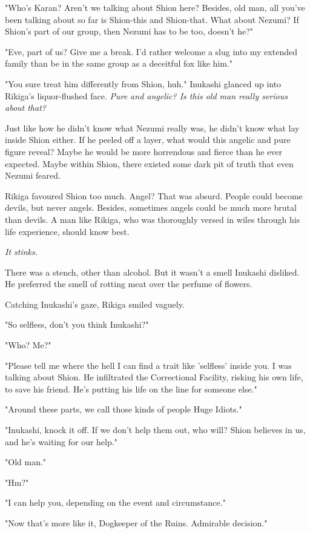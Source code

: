 "Who's Karan? Aren't we talking about Shion here? Besides, old man, all
you've been talking about so far is Shion-this and Shion-that. What
about Nezumi? If Shion's part of our group, then Nezumi has to be too,
doesn't he?"

"Eve, part of us? Give me a break. I'd rather welcome a slug into my
extended family than be in the same group as a deceitful fox like him."

"You sure treat him differently from Shion, huh." Inukashi glanced up
into Rikiga's liquor-flushed face. \emph{Pure and angelic? Is this old man
really serious about that?}

Just like how he didn't know what Nezumi really was, he didn't know what
lay inside Shion either. If he peeled off a layer, what would this
angelic and pure figure reveal? Maybe he would be more horrendous and
fierce than he ever expected. Maybe within Shion, there existed some
dark pit of truth that even Nezumi feared.

Rikiga favoured Shion too much. Angel? That was absurd. People could
become devils, but never angels. Besides, sometimes angels could be much
more brutal than devils. A man like Rikiga, who was thoroughly versed in
wiles through his life experience, should know best.

\emph{It stinks.}

There was a stench, other than alcohol. But it wasn't a smell Inukashi
disliked. He preferred the smell of rotting meat over the perfume of
flowers.

Catching Inukashi's gaze, Rikiga smiled vaguely.

"So selfless, don't you think Inukashi?"

"Who? Me?"

"Please tell me where the hell I can find a trait like 'selfless' inside
you. I was talking about Shion. He infiltrated the Correctional
Facility, risking his own life, to save his friend. He's putting his
life on the line for someone else."

"Around these parts, we call those kinds of people Huge Idiots."

"Inukashi, knock it off. If we don't help them out, who will? Shion
believes in us, and he's waiting for our help."

"Old man."

"Hm?"

"I can help you, depending on the event and circumstance."

"Now that's more like it, Dogkeeper of the Ruins. Admirable decision."


